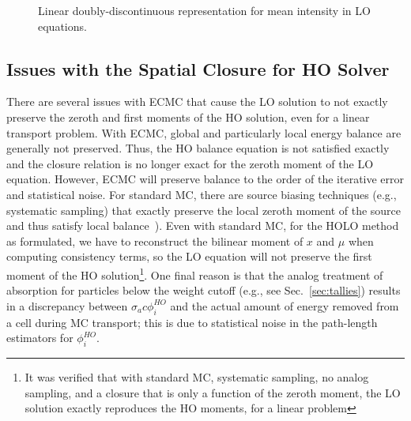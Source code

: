 \begin{figure}[H]
    \centering
    {}
    \caption{Linear doubly-discontinuous representation for mean intensity in LO equations.     \label{fig:ldd_space}}
\end{figure}


\subsection{Issues with the Spatial Closure for HO Solver}
\label{sec:ecmc_issues}
There are several issues with ECMC that cause the LO solution to not exactly preserve
the zeroth and first moments of the HO solution, even for a linear transport problem.  With ECMC, global and particularly local
energy balance are generally not preserved. 
Thus, the HO balance equation is not satisfied exactly and the closure relation is no
longer exact for the zeroth moment of the LO equation.
However, ECMC will preserve balance to the order of
the iterative error and statistical noise.  
For standard MC, there
are source biasing techniques (e.g., systematic
sampling) that exactly preserve the local zeroth moment of the
source and thus satisfy local balance~\cite{shultis_mc,wollaber_review}).
Even with standard MC, for the HOLO method as formulated, we have to reconstruct the bilinear moment
of $x$ and $\mu$ when computing consistency terms, so the LO equation will not
preserve the first moment of the HO solution\footnote{It was verified that with
standard MC, systematic sampling, no analog sampling, and a closure that is only a
function of the zeroth moment, the LO solution exactly reproduces the HO moments, for
a linear problem}.  One final reason is that the analog treatment of absorption for
particles below the weight cutoff (e.g., see Sec.~\ref{sec:tallies}) results in a
discrepancy between $\sigma_a c \phi^{HO}_i$ and the actual amount of energy removed from a cell during MC
transport; this is due to statistical noise in the path-length
estimators for $\phi^{HO}_i$.  



